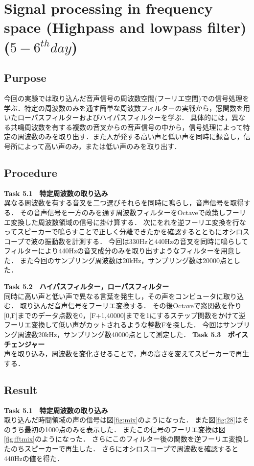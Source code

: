 \documentclass[11pt, a4paper,twocolumn]{jarticle}
\begin{document}
\section{Signal processing in frequency space (Highpass and lowpass filter) ($5-6^{th} day$)}
\subsection{Purpose}
今回の実験では取り込んだ音声信号の周波数空間(フーリエ空間)での信号処理を学ぶ．特定の周波数のみを通す簡単な周波数フィルターの実戦から，窓関数を用いたローパスフィルターおよびハイパスフィルターを学ぶ．
具体的には，異なる共鳴周波数を有する複数の音叉からの音声信号の中から，信号処理によって特定の周波数のみを取り出す．また人が発する高い声と低い声を同時に録音し，信号所によって高い声のみ，または低い声のみを取り出す．
\subsection{Procedure}
\noindent
\textbf{Task 5.1　特定周波数の取り込み} \\
異なる周波数を有する音叉を二つ選びそれらを同時に鳴らし，音声信号を取得する．
その音声信号を一方のみを通す周波数フィルターをOctaveで政策しフーリエ変換した周波数領域の信号に掛け算する．
次にをれを逆フーリエ変換を行なってスピーカーで鳴らすことで正しく分離できたかを確認するとともにオシロスコープで波の振動数を計測する．
今回は330Hzと440Hzの音叉を同時に鳴らしてフィルターにより440Hzの音叉成分のみを取り出すようなフィルターを用意した．
また今回のサンプリング周波数は20kHz，サンプリング数は20000点とした．

\noindent
\textbf{Task 5.2　ハイパスフィルター，ローパスフィルター} \\
同時に高い声と低い声で異なる言葉を発生し，その声をコンピュータに取り込む．
取り込んだ音声信号をフーリエ変換する．
その後Octaveで窓関数を作り[0,F]までのデータ点数を0，[F+1,40000]までを1にするステップ関数をかけて逆フーリエ変換して低い声がカットされるような整数Fを探した．
今回はサンプリング周波数20kHz，サンプリング数40000点として測定した．
\noindent
\textbf{Task 5.3　ボイスチェンジャー} \\
声を取り込み，周波数を変化させることで，声の高さを変えてスピーカーで再生する．
\subsection{Result}
\noindent
\textbf{Task 5.1　特定周波数の取り込み} \\
取り込んだ時間領域の声の信号は図\ref{fig:mix}のようになった．
また図\ref{fig:28}はそのうち最初の1000点のみを表示した．
またこの信号のフーリエ変換は図\ref{fig:fftmix}のようになった．
さらにこのフィルター後の関数を逆フーリエ変換したのちスピーカーで再生した．
さらにオシロスコープで周波数を確認すると440Hzの値を得た．
\end{document}
